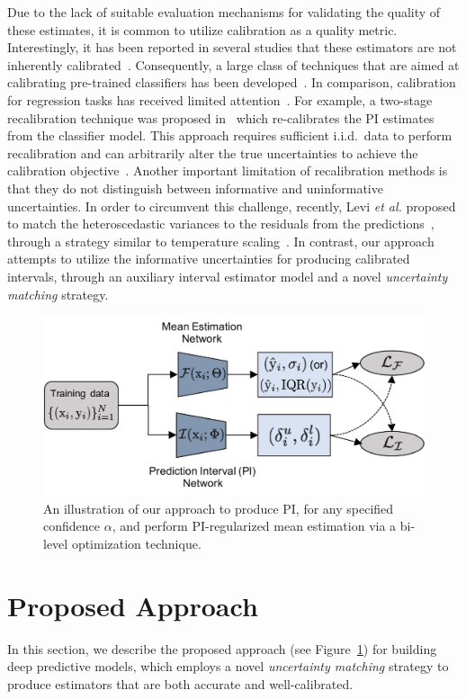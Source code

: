 \documentclass[letterpaper]{article} %
\begin{document}
Due to the lack of suitable evaluation mechanisms for validating the quality of these estimates, it is common to utilize calibration as a quality metric. Interestingly, it has been reported in several studies that these estimators are not inherently calibrated~\cite{kuleshov2018accurate}. Consequently, a large class of techniques that are aimed at calibrating pre-trained classifiers has been developed~\cite{guo2017calibration,seo2019singleshot,nixon2019measuring,kuleshov2015calibrated}. In comparison, calibration for regression tasks has received limited attention~\cite{gneiting2007strictly,kuleshov2018accurate,levi2019evaluating}. For example, a two-stage recalibration technique was proposed in~\cite{kuleshov2018accurate} which re-calibrates the PI estimates from the classifier model. This approach requires sufficient i.i.d.\ data to perform recalibration and can arbitrarily alter the true uncertainties to achieve the calibration objective~\cite{levi2019evaluating}. Another important limitation of recalibration methods is that they do not distinguish between informative and uninformative uncertainties. In order to circumvent this challenge, recently, Levi \textit{et al.} proposed to match the heteroscedastic variances to the residuals from the predictions~\cite{levi2019evaluating}, through a strategy similar to temperature scaling~\cite{guo2017calibration}. In contrast, our approach attempts to utilize the informative uncertainties for producing calibrated intervals, through an auxiliary interval estimator model and a novel \textit{uncertainty matching} strategy.
\begin{figure}[t]
	\centering
	\includegraphics[width=0.95\linewidth]{approach_BD.pdf}
	\caption{An illustration of our approach to produce PI, for any specified confidence $\alpha$, and perform PI-regularized mean estimation via a bi-level optimization technique.}
	\label{fig:BD}
\end{figure}

\section{Proposed Approach}
In this section, we describe the proposed approach (see Figure~\ref{fig:BD}) for building deep predictive models, which employs a novel \textit{uncertainty matching} strategy to produce estimators that are both accurate and well-calibrated.
\end{document}
